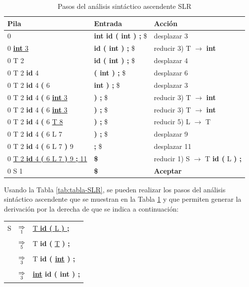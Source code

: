 \begin{table}[htp]
    \caption{Pasos del análisis sintáctico ascendente SLR}
    \label{tab:analisis-SLR}
    \centering
    \begin{tabular}{l|l|l}
      \hline \hline \textbf{Pila}                & \textbf{Entrada}                                 & \textbf{Acción} \\
      \hline 
      0                       & \textbf{{int} id ( int ) ;} \$ & desplazar 3  \\
      0 \underline{{\bf int} 3}  & \textbf{id ( int ) ;} \$       & reducir 3) T $\rightarrow$ {\bf int} \\
      0 T 2  & \textbf{id ( int ) ;} \$       & desplazar 4 \\
      0 T 2 {\bf id} 4    & \textbf{( int ) ;} \$       & desplazar 6 \\
      0 T 2 {\bf id} 4 {\bf (} 6  & \textbf{int ) ;} \$           & desplazar 3 \\
      0 T 2 {\bf id} 4 {\bf (} 6 \underline{{\bf int} 3} & \textbf{) ;} \$    & reducir 3) T $\rightarrow$ {\bf int} \\
      0 T 2 {\bf id} 4 {\bf (} 6 \underline{{\bf int} 3}               & \textbf{) ;} \$  & reducir 3) T $\rightarrow$ {\bf int} \\
      0 T 2 {\bf id} 4 {\bf (} 6 \underline{T 8}                       & \textbf{) ;} \$  & reducir 5) L $\rightarrow$ T\\
      0 T 2 {\bf id} 4 {\bf (} 6 L 7                                   & \textbf{) ;} \$  & desplazar 9  \\
      0 T 2 {\bf id} 4 {\bf (} 6 L 7 {\bf )} 9  & \textbf{;} \$    & desplazar 11\\
      0 \underline{T 2 {\bf id} 4 {\bf (} 6 L 7 {\bf )} 9 {\bf ;} 11}  & \textbf{\$}   & reducir 1) S $\rightarrow$ T {\bf id (} L {\bf ) ;}\\
      0 S 1  & \textbf{\$}      & \textbf{Aceptar}\\
      \hline
    \end{tabular}

\end{table}


Usando la Tabla \ref{tab:tabla-SLR}, se pueden realizar los pasos del análisis sintáctico ascendente que se muestran en la Tabla \ref{tab:analisis-SLR} y que permiten generar la derivación por la derecha de que se indica a continuación:
\begin{center}
\begin{tabular}{lcl}
     {S} & $\mathop{\Rightarrow}\limits_{1}$ & \underline{T {\bf id (} {L} {\bf ) ;}} \\
               & $\mathop{\Rightarrow}\limits_{5}$ & T {\bf id (} \underline{{T}} {\bf ) ;} \\
               & $\mathop{\Rightarrow}\limits_{3}$ & {T} {\bf id ( \underline{int} ) ;} \\
               & $\mathop{\Rightarrow}\limits_{3}$ & {\bf \underline{int} id ( int ) ;}
 \end{tabular}
\end{center}


